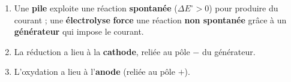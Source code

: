 \documentclass[11pt,a4paper]{article}
\begin{document}
\begin{corrige}
\begin{enumerate}[label=\alph*)]
  \item Une \textbf{pile} exploite une réaction \textbf{spontanée} ($\Delta E^{\circ}>0$) pour produire
        du courant ; une \textbf{électrolyse} \textbf{force} une réaction \textbf{non spontanée} grâce
        à un \textbf{générateur} qui impose le courant.
  \item La réduction a lieu à la \textbf{cathode}, reliée au pôle \textbf{$-$} du générateur.
  \item L'oxydation a lieu à l'\textbf{anode} (reliée au pôle $+$).
\end{enumerate}
\end{corrige}
\end{document}
